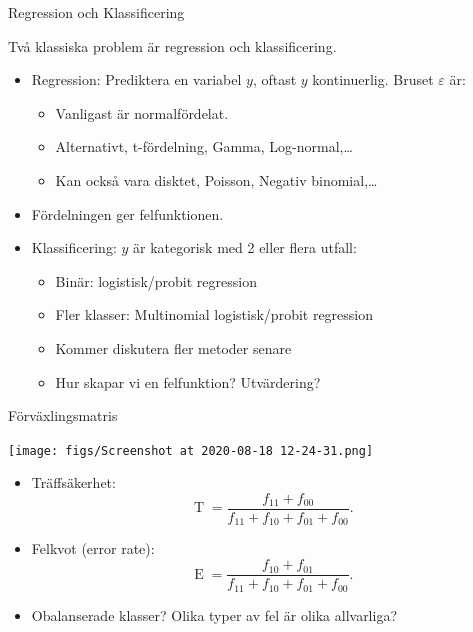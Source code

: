 \documentclass[10pt,english]{beamer}
\begin{document}
\begin{frame}{Regression och Klassificering}
    
    Två klassiska problem är regression och klassificering.

    \begin{itemize}
        \item Regression: Prediktera en variabel $y$, oftast $y$ kontinuerlig. Bruset $\varepsilon$ är:
        \begin{itemize}
            \item Vanligast är normalfördelat.
            \item Alternativt, t-fördelning, Gamma, Log-normal,\dots
            \item Kan också vara disktet, Poisson, Negativ binomial,\dots
        \end{itemize}
        \item Fördelningen ger felfunktionen.
        \item Klassificering: $y$ är kategorisk med 2 eller flera utfall:
        \begin{itemize}
            \item Binär: logistisk/probit regression
            \item Fler klasser: Multinomial logistisk/probit regression
            \item Kommer diskutera fler metoder senare
            \item Hur skapar vi en felfunktion? Utvärdering?
        \end{itemize}
    \end{itemize}

\end{frame}

\begin{frame}{Förväxlingsmatris}
\begin{center}
    \texttt{[image: figs/Screenshot at 2020-08-18 12-24-31.png]}
\end{center}

\begin{itemize}
    \item Träffsäkerhet:
    \begin{equation*}
        \operatorname{T} = \frac{f_{11} + f_{00}}{f_{11} + f_{10} + f_{01} + f_{00}}.
    \end{equation*}
    \item Felkvot (error rate):
    \begin{equation*}
        \operatorname{E} = \frac{f_{10} + f_{01}}{f_{11} + f_{10} + f_{01} + f_{00}}.
    \end{equation*}
    \item Obalanserade klasser? Olika typer av fel är olika allvarliga?
\end{itemize}
    
\end{frame}
\end{document}
